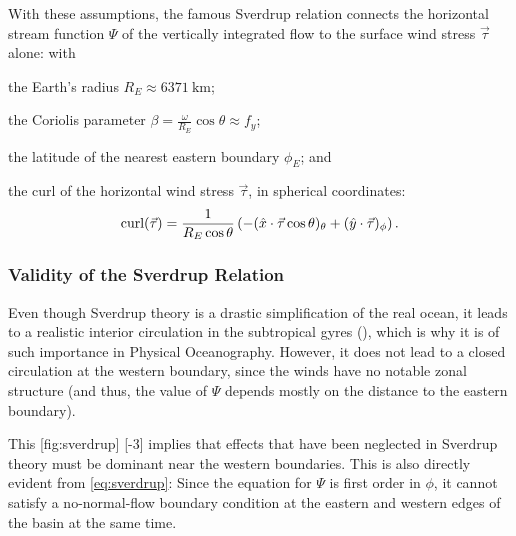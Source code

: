 With these assumptions, the famous Sverdrup relation connects the horizontal stream function \(\Psi\) of the vertically integrated flow to the surface wind stress \(\vec{\tau}\) alone:
%
%
with
%
\begin{items}
	\item the Earth's radius \(R_E \approx \SI{6371}{\kilo\metre}\);
	\item the Coriolis parameter \(\beta = \frac{\omega}{R_E} \cos\theta \approx f_y\);
	\item the latitude of the nearest eastern boundary \(\phi_E\); and
	\item the curl of the horizontal wind stress \(\vec{\tau}\), in spherical coordinates:
	\begin{equation}\text{curl}(\vec{\tau}) = \frac{1}{R_E \cos\theta} \left( -(\hat{x} \cdot \vec{\tau} \cos\theta)_\theta + (\hat{y} \cdot \vec{\tau})_\phi \right).\end{equation}
\end{items}

\subsubsection{Validity of the Sverdrup Relation}
Even though Sverdrup theory is a drastic simplification of the real ocean, it leads to a realistic interior circulation in the subtropical gyres (), which is why it is of such importance in Physical Oceanography. However, it does not lead to a closed circulation at the western boundary, since the winds have no notable zonal structure (and thus, the value of \(\Psi\) depends mostly on the distance to the eastern boundary). 

This%
%
[fig:sverdrup]%
{}[-3]%
%
implies that effects that have been neglected in Sverdrup theory must be dominant near the western boundaries. This is also directly evident from \eqref{eq:sverdrup}: Since the equation for \(\Psi\) is first order in \(\phi\), it cannot satisfy a no-normal-flow boundary condition at the eastern and western edges of the basin at the same time.

